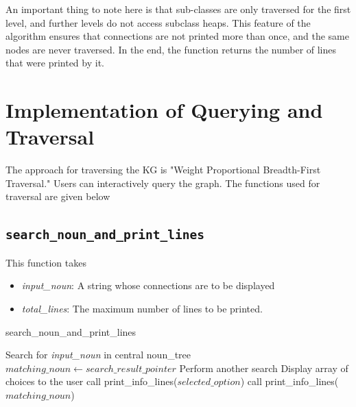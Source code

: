 \documentclass[conference]{IEEEtran}
\begin{document}
An important thing to note here is that sub-classes are only traversed for the first level, and further levels do not access subclass heaps. This feature of the algorithm ensures that connections are not printed more than once, and the same nodes are never traversed.
In the end, the function returns the number of lines that were printed by it.



\section{Implementation of Querying and Traversal}

The approach for traversing the KG is "Weight Proportional Breadth-First Traversal." Users can interactively query the graph. The functions used for traversal are given below 

\subsection{\textbf{\texttt{search\_noun\_and\_print\_lines}}}

This function takes
\begin{itemize}
\item \textit{input\_noun}: A string whose connections are to be displayed
\item \textit{total\_lines}: The maximum number of lines to be printed. 
\end{itemize}


\begin{algorithm}
\caption{search\_noun\_and\_print\_lines}
\begin{algorithmic}[1]
    \State Search for \textit{input\_noun} in central noun\_tree
    \State $matching\_noun \gets search\_result\_pointer$
        \State Perform another search
        \State Display array of choices to the user
            \State call print\_info\_lines($selected\_option$)
        \EndFor
    \Else
        \State call print\_info\_lines($matching\_noun$)
    \EndIf
\EndProcedure
\end{algorithmic}
\end{algorithm}
\end{document}
